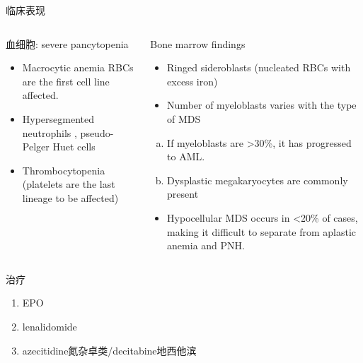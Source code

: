 \documentclass[
  ignorenonframetext,
]{beamer}
\providecommand{\tightlist}{%
  \setlength{\itemsep}{0pt}\setlength{\parskip}{0pt}}
\begin{document}
\begin{frame}
\begin{block}{临床表现}
\protect\hypertarget{ux4e34ux5e8aux8868ux73b0-4}{}
\begin{columns}[T]
\begin{column}{0.3\textwidth}
\begin{block}{血细胞: severe pancytopenia}
\protect\hypertarget{ux8840ux7ec6ux80de-severe-pancytopenia}{}
\begin{itemize}
\item
  Macrocytic anemia RBCs are the first cell line affected.
\item
  Hypersegmented neutrophils , pseudo-Pelger Huet cells
\item
  Thrombocytopenia (platelets are the last lineage to be affected)
\end{itemize}
\end{block}
\end{column}

\begin{column}{0.3\textwidth}
\begin{block}{Bone marrow findings}
\protect\hypertarget{bone-marrow-findings}{}
\begin{itemize}
\item
  Ringed sideroblasts (nucleated RBCs with excess iron)
\item
  Number of myeloblasts varies with the type of MDS
\end{itemize}

\begin{enumerate}
[(a)]
\item
  If myeloblasts are \textgreater30\%, it has progressed to AML.
\item
  Dysplastic megakaryocytes are commonly present
\end{enumerate}

\begin{itemize}
\tightlist
\item
  Hypocellular MDS occurs in \textless20\% of cases, making it difficult
  to separate from aplastic anemia and PNH.
\end{itemize}
\end{block}
\end{column}
\end{columns}
\end{block}
\end{frame}

\begin{frame}
\begin{block}{治疗}
\protect\hypertarget{ux6cbbux7597-5}{}
\begin{enumerate}
\item
  EPO
\item
  lenalidomide
\item
  azecitidine氮杂卓类/decitabine地西他滨
\end{enumerate}
\end{block}
\end{frame}
\end{document}
